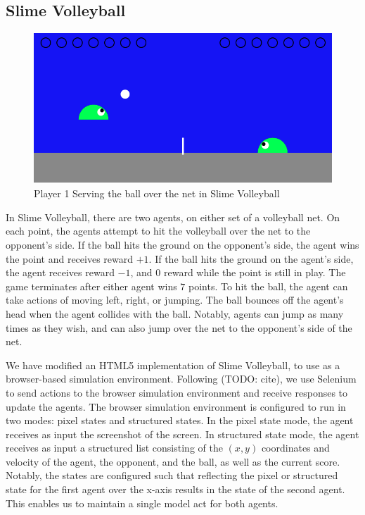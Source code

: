 \documentclass[10pt,twocolumn,letterpaper]{article}
\begin{document}
\subsection{Slime Volleyball}


\begin{figure}[h]
\center
\includegraphics[width=\columnwidth]{SlimeVolleyBall}
\caption{
Player 1 Serving the ball over the net in Slime Volleyball
}\label{fig:slime}
\end{figure}


In Slime Volleyball, there are two agents, on either set of a volleyball net.
On each point, the agents attempt to hit the volleyball over the net to the
opponent's side. If the ball hits the ground on the opponent's side, the agent
wins the point and receives reward $+1$. If the ball hits the ground on the
agent's side, the agent receives reward $-1$, and $0$ reward while the point
is still in play. The game terminates after either agent wins $7$ points. To
hit the ball, the agent can take actions of moving left, right, or jumping.
The ball bounces off the agent's head when the agent collides with the ball.
Notably, agents can jump as many times as they wish, and can also jump over
the net to the opponent's side of the net.

We have modified an HTML5 implementation of Slime Volleyball, to use
as a browser-based simulation environment. Following (TODO: cite), we use
Selenium to send actions to the browser simulation environment and receive
responses to update the agents. The browser simulation environment is
configured to run in two modes: pixel states and structured states. In the
pixel state mode, the agent receives as input the screenshot of the screen. In
structured state mode, the agent receives as input a structured list
consisting of the $(x, y)$ coordinates and velocity of the agent, the
opponent, and the ball, as well as the current score. Notably, the states are
configured such that reflecting the pixel or structured state for the first
agent over the x-axis results in the state of the second agent. This enables
us to maintain a single model act for both agents.
\end{document}
